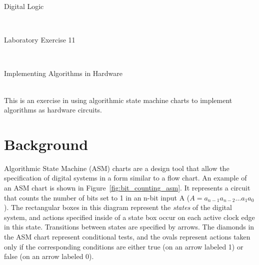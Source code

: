 \documentclass[epsfig,10pt,fullpage]{article}
\newcommand{\LabNum}{11}
\begin{document}
\centerline{\huge Digital Logic}
~\\
\centerline{\huge Laboratory Exercise \LabNum}
~\\
\centerline{\large Implementing Algorithms in Hardware}
~\\

This is an exercise in using algorithmic state machine charts to implement algorithms as hardware circuits.

\section*{Background}
Algorithmic State Machine (ASM) charts are a design tool that allow
the specification of digital systems in a form similar to a flow chart. An example of
an ASM chart is shown in Figure~\ref{fig:bit_counting_asm}. It represents a circuit that 
counts the number of bits set to 1 in an n-bit input A ($A=a_{n-1}a_{n-2}{\ldots}a_1a_0$).
The rectangular boxes in this diagram represent the {\it states} of the digital system, 
and actions specified inside of a state box occur on each active clock edge in this
state.  Transitions between states are specified by arrows. 
The diamonds in the ASM chart represent conditional tests, and the ovals represent 
actions taken only if the corresponding conditions are either true (on an arrow labeled 1) 
or false (on an arrow labeled 0).
\end{document}
